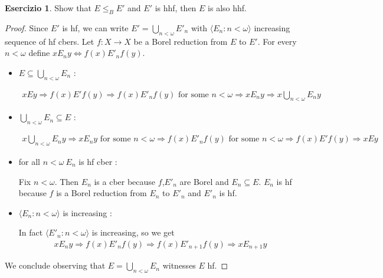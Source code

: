 \documentclass[a4paper,12pt]{article}
\theoremstyle{plain}
\theoremstyle{definition}
\newtheorem{esercizio}{Esercizio}
\theoremstyle{remark}
\begin{document}
\begin{esercizio}

	Show that $E \leq_B E'$ and $E'$ is hhf, then $E$ is also hhf.

\end{esercizio}

\begin{proof}

	Since $E'$ is hf, we can write $E' = \bigcup_{n < \omega} E'_n$ with $\langle E_n : n < \omega \rangle$ increasing sequence of hf cbers.
	Let $f: X \to X$ be a Borel reduction from $E$ to $E'$. 
	For every $n < \omega$ define $x E_n y \iff f(x) E'_n f(y)$.
	\begin{itemize}

		\item $E \subseteq \bigcup_{n < \omega} E_n$ :

			\begin{align}
				x E y \Rightarrow f(x) E' f(y) \Rightarrow f(x) E'_n f(y) \text{ for some }n < \omega
				\Rightarrow x E_n y \Rightarrow x \bigcup_{n < \omega} E_n y
			\end{align}

		\item $\bigcup_{n < \omega} E_n \subseteq E$ :

			\begin{align}
				x \bigcup_{n < \omega} E_n y \Rightarrow x E_n y \text{ for some }n < \omega \Rightarrow
				f(x) E'_n f(y) \text{ for some }n < \omega \Rightarrow f(x) E' f(y) \Rightarrow x E y
			\end{align}

		\item for all $n < \omega \ E_n$ is hf cber : 
			
			Fix $n < \omega$. Then $E_n$ is a cber because $f$,$E'_n$ are Borel and $E_n \subseteq E$.
			$E_n$ is hf because $f$ is a Borel reduction from $E_n$ to $E'_n$ and $E'_n$ is hf.

		\item $\langle E_n : n < \omega \rangle$ is increasing :

			In fact $\langle E'_n : n < \omega \rangle$ is increasing, so we get
			\begin{align}
				x E_n y \Rightarrow f(x) E'_n f(y) \Rightarrow f(x) E'_{n+1} f(y) \Rightarrow x E_{n+1} y
			\end{align}

	\end{itemize}

	We conclude observing that $E = \bigcup_{n < \omega} E_n$ witnesses $E$ hf.

\end{proof}
\end{document}
